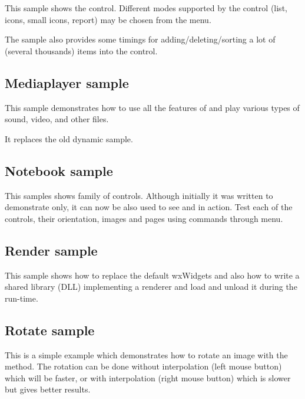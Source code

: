 This sample shows the  control. Different modes
supported by the control (list, icons, small icons, report) may be chosen from
the menu.

The sample also provides some timings for adding/deleting/sorting a lot of
(several thousands) items into the control.


\subsection{Mediaplayer sample}\label{samplemediaplayer}

This sample demonstrates how to use all the features of
 and play various types of sound, video,
and other files.


It replaces the old dynamic sample.

\subsection{Notebook sample}\label{samplenotebook}

This samples shows  family of controls.
Although initially it was written to demonstrate 
only, it can now be also used to see  and
 in action. Test each of the controls, their
orientation, images and pages using commands through menu.



\subsection{Render sample}\label{samplerender}

This sample shows how to replace the default wxWidgets
 and also how to write a shared library
(DLL) implementing a renderer and load and unload it during the run-time.



\subsection{Rotate sample}\label{samplerotate}

This is a simple example which demonstrates how to rotate an image with
the  method. The rotation can
be done without interpolation (left mouse button) which will be faster,
or with interpolation (right mouse button) which is slower but gives
better results.


